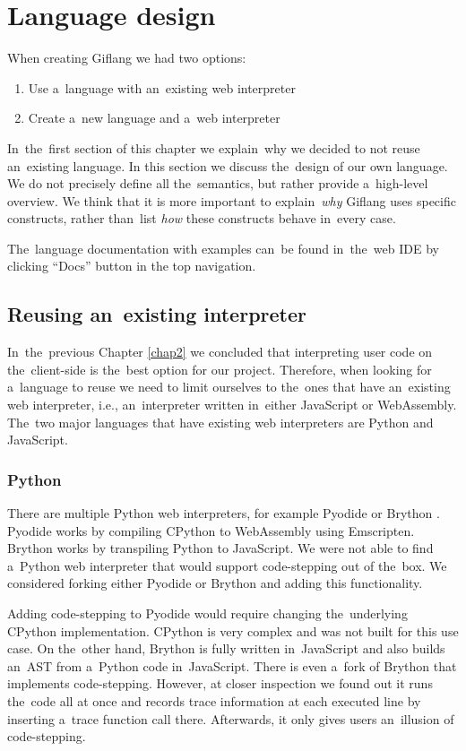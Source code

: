 
\chapter{Language design}
\label{chap3:language_design}

When creating Giflang we had two options:
\begin{enumerate}
    \item Use a~language with an~existing web interpreter
    \item Create a~new language and a~web interpreter
\end{enumerate}

In~the~first section of this chapter we explain~why we decided to not reuse an~existing language. In this section we discuss the~design of our own language. We do not
precisely define all the~semantics, but rather provide a~high-level overview. We think that it is more important to explain~\emph{why} Giflang uses specific
constructs, rather than~list \emph{how} these constructs behave in~every case.

The~language documentation with examples can~be found in~the~web IDE by clicking ``Docs'' button in the top navigation.

\section{Reusing an~existing interpreter}
In~the~previous Chapter \ref{chap2} we concluded that interpreting user code on the~client-side is the~best option for our project. Therefore, when
looking for a~language to reuse we need to limit ourselves to the~ones that have an~existing web interpreter, i.e., an~interpreter written in~either
JavaScript or WebAssembly. The~two major languages that have existing web interpreters are Python and JavaScript.

\subsection{Python}
There are multiple Python web interpreters, for example Pyodide \cite{Pyodide} or Brython \cite{Brython}. Pyodide works by compiling CPython \cite{CPython}
to WebAssembly using Emscripten. Brython works by transpiling Python to JavaScript. We were not able to find a~Python web interpreter that would
support code-stepping out of the~box. We considered forking either Pyodide or Brython and adding this functionality.

Adding code-stepping to Pyodide would require changing the~underlying CPy\-thon implementation. CPython is very complex and was not built for this use case.
On the~other hand, Brython is fully written in~JavaScript and also builds an~AST from a~Python code in~JavaScript. There
is even a~fork of Brython \cite{PythonDebugger} that implements code-stepping. However, at closer inspection we found out it runs the~code all at once and records trace information
at each executed line by inserting a~trace function call there. Afterwards, it only gives users an~illusion of code-stepping.


